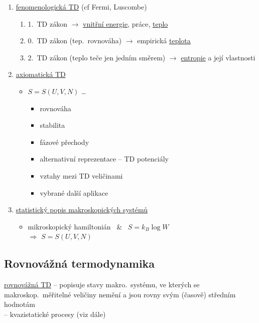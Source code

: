 \begin{enumerate}[label=\Roman*)]
  \item \underline{fenomenologická TD} (cf Fermi, Luscombe)
  \begin{enumerate}[label=\arabic*)]
    \item 1.\ TD zákon $\to$ \underline{vnitřní energie}, práce, \underline{teplo}
    \item 0.\ TD zákon (tep.\ rovnováha) $\to$ empirická \underline{teplota}
    \item 2.\ TD zákon (teplo teče jen jedním směrem) $\to$ \underline{entropie} a její vlastnosti
  \end{enumerate}
  \item \underline{axiomatická TD}
  \begin{itemize}
    \item $S = S(U,V,N)$ \quad \dots\ 
    \begin{itemize}[label=$\to$]
      \item rovnováha
      \item stabilita
      \item fázové přechody
      \item alternativní reprezentace -- TD potenciály
      \item vztahy mezi TD veličinami
      \item vybrané další aplikace
    \end{itemize}
  \end{itemize}
  \item \underline{statistický popis makroskopických systémů}
  \begin{itemize}
    \item mikroskopický hamiltonián \ \& \ $S = k_B\log W$ \quad {} \\
          $\Rightarrow$ \quad $S = S(U,V,N)$
          \hfill {}
  \end{itemize}
\end{enumerate}

\subsection{Rovnovážná termodynamika}

\begin{definice}[Rovnovážná TD]
\underline{rovnovážná TD} -- popisuje stavy makro.\ systému, ve kterých se makroskop.\ měřitelné veličiny nemění a jsou rovny svým (časově) středním hodnotám \\
\hfill -- kvazistatické procesy (viz dále)
\end{definice}

